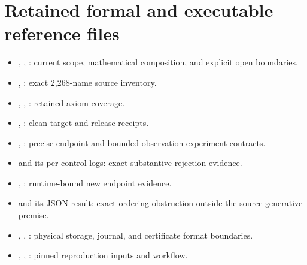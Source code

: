 \documentclass[11pt]{article}
\begin{document}
\section{Retained formal and executable reference files}
\small
\begin{itemize}
\setlength{\itemsep}{2pt}
\setlength{\parsep}{0pt}
\item {}, , :
current scope, mathematical composition, and explicit open boundaries.
\item {}, :
exact 2,268-name source inventory.
\item {}, ,
: retained axiom coverage.
\item {},
: clean target and release receipts.
\item {}, :
precise endpoint and bounded observation experiment contracts.
\item {} and its per-control logs:
exact substantive-rejection evidence.
\item {},
: runtime-bound new endpoint evidence.
\item {} and its JSON result:
exact ordering obstruction outside the source-generative premise.
\item {}, , :
physical storage, journal, and certificate format boundaries.
\item {}, , :
pinned reproduction inputs and workflow.
\end{itemize}
\normalsize
\end{document}
